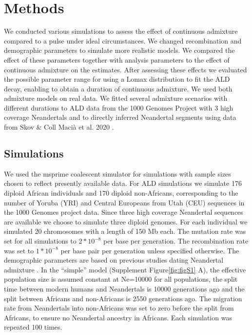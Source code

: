 \documentclass[]{article}
\begin{document}
\section{Methods}\label{methods}

We conducted various simulations to assess the effect of continuous
admixture compared to a pulse under ideal circumstances. We changed
recombination and demographic parameters to simulate more realistic
models. We compared the effect of these parameters together with
analysis parameters to the effect of continuous admixture on the
estimates. After assessing these effects we evaluated the possible
parameter range for using a Lomax distribution to fit the ALD decay,
enabling to obtain a duration of continuous admixture. We used both admixture models on real data. We fitted several admixture scenarios with different durations to ALD data from the 1000 Genomes Project \citep{the_1000_genomes_project_consortium_global_2015} with 3 high coverage Neandertals \citep{prufer_complete_2013,prufer_high-coverage_2017,mafessoni_high_coverage_2020} and to directly inferred Neandertal segments using data from Skov \& Coll Maci\`{a} et al. 2020 \citep{skov_nature_2020}.

\subsection{Simulations}\label{simulations}

We used the msprime coalescent simulator
\citep{kelleher_efficient_2016} for simulations with sample sizes
chosen to reflect presently available data. For ALD simulations we simulate 176 diploid
African individuals and 170 diploid non-Africans, corresponding to the
number of Yoruba (YRI) and Central Europeans from Utah (CEU)
sequences in the 1000 Genomes project data. Since three
high coverage Neandertal sequences are available we choose to
simulate three diploid genomes. For each individual we simulated 20
chromosomes with a length of 150 Mb each. The mutation rate was set for
all simulations to \(2*10^{-8}\) per base per generation. The
recombination rate was set to \(1*10^{-8}\) per base pair per generation
unless specified otherwise. The demographic parameters are based on
previous studies dating Neandertal admixture
\citep{sankararaman_date_2012,fu_genome_2014,moorjani_genetic_2016}. In
the ``simple'' model (Supplement Figure\ref{fig:figS1} A), the effective
population size is assumed constant at Ne=10000 for all populations, the
split time between modern humans and Neandertals is 10000 generations
ago and the split between Africans and non-Africans is 2550
generations ago. The migration rate from Neandertals into non-Africans
was set to zero before the split from Africans, to ensure no Neandertal
ancestry in Africans. Each simulation was repeated 100 times. 
\end{document}
